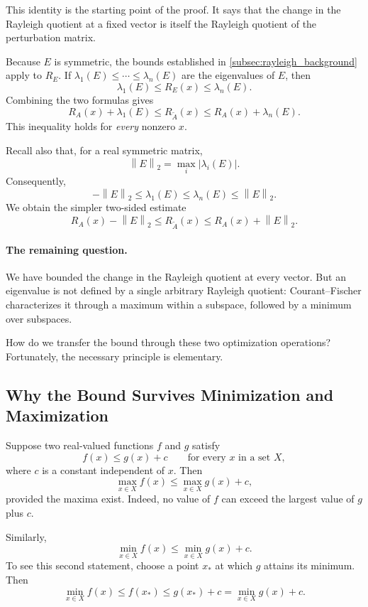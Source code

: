 \documentclass[14pt,letterpaper]{article}
\theoremstyle{plain}
\theoremstyle{definition}
\theoremstyle{remark}
\newcommand{\norm}[1]{\left\lVert #1 \right\rVert}
\newcommand{\abs}[1]{\left| #1 \right|}
\begin{document}
This identity is the starting point of the proof.
It says that the change in the Rayleigh quotient at a
fixed vector is itself the Rayleigh quotient of the
perturbation matrix.

Because $E$ is symmetric, the bounds established in
\cref{subsec:rayleigh_background} apply to $R_E$.
If $\lambda_1(E)\leq\cdots\leq\lambda_n(E)$ are the
eigenvalues of $E$, then
\[
\lambda_1(E)\leq R_E(x)\leq\lambda_n(E).
\]
Combining the two formulas gives
\[
\boxed{
R_A(x)+\lambda_1(E)
\leq R_{\widetilde A}(x)
\leq R_A(x)+\lambda_n(E).
}
\]
This inequality holds for \emph{every} nonzero $x$.

Recall also that, for a real symmetric matrix,
\[
\norm{E}_2=\max_i\abs{\lambda_i(E)}.
\]
Consequently,
\[
-\norm{E}_2\leq\lambda_1(E)
\leq\lambda_n(E)\leq\norm{E}_2.
\]
We obtain the simpler two-sided estimate
\[
\boxed{
R_A(x)-\norm{E}_2
\leq R_{\widetilde A}(x)
\leq R_A(x)+\norm{E}_2.
}
\]

\paragraph{The remaining question.}
We have bounded the change in the Rayleigh quotient
at every vector. But an eigenvalue is not defined by
a single arbitrary Rayleigh quotient: Courant--Fischer
characterizes it through a maximum within a subspace,
followed by a minimum over subspaces.

How do we transfer the bound through these two
optimization operations? Fortunately, the necessary
principle is elementary.


\subsection{Why the Bound Survives Minimization and Maximization}
\label{subsec:weyl_optimization}

Suppose two real-valued functions $f$ and $g$ satisfy
\[
f(x)\leq g(x)+c
\qquad\text{for every }x\text{ in a set }X,
\]
where $c$ is a constant independent of $x$.
Then
\[
\boxed{
\max_{x\in X} f(x)
\leq \max_{x\in X}g(x)+c,
}
\]
provided the maxima exist. Indeed, no value of $f$
can exceed the largest value of $g$ plus $c$.

Similarly,
\[
\boxed{
\min_{x\in X} f(x)
\leq \min_{x\in X}g(x)+c.
}
\]
To see this second statement, choose a point $x_*$
at which $g$ attains its minimum. Then
\[
\min_{x\in X}f(x)
\leq f(x_*)\leq g(x_*)+c
=\min_{x\in X}g(x)+c.
\]
\end{document}
